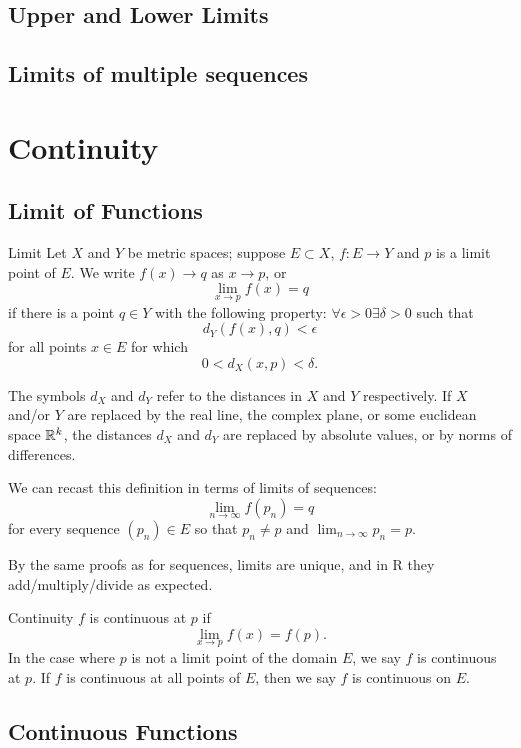\section{Upper and Lower Limits}

\section{Limits of multiple sequences}

\chapter{Continuity}
\section{Limit of Functions}
\begin{defn}{Limit}{}
Let $X$ and $Y$ be metric spaces; suppose $E \subset X$, $f:E\to Y$ and $p$ is a limit point of $E$. We write $f(x) \to q$ as $x \to p$, or
\[ \lim_{x\to p}f(x)=q \]
if there is a point $q \in Y$ with the following property: $\forall \epsilon > 0 \exists \delta > 0$ such that \[ d_Y(f(x), q) < \epsilon \] for all points $x \in E$ for which \[ 0 < d_X(x, p) < \delta. \]
\end{defn}

\begin{remark}
The symbols $d_X$ and $d_Y$ refer to the distances in $X$ and $Y$ respectively. If $X$ and/or $Y$ are replaced by the real line, the complex plane, or some euclidean space $\mathbb R^k$, the distances $d_X$ and $d_Y$ are replaced by absolute values, or by norms of differences.
\end{remark}

We can recast this definition in terms of limits of sequences:
\[ \lim_{n\to\infty}f(p_n)=q \]
for every sequence $(p_n) \in E$ so that $p_n \neq p$ and $\lim_{n\to\infty} p_n = p$.

By the same proofs as for sequences, limits are unique, and in R they add/multiply/divide as expected.

\begin{defn}{Continuity}{}
$f$ is continuous at $p$ if
\[ \lim_{x\to p}f(x) = f(p). \]
In the case where $p$ is not a limit point of the domain $E$, we say $f$ is continuous at $p$. If $f$ is continuous at all points of $E$, then we say $f$ is continuous on $E$.
\end{defn}

\section{Continuous Functions}

